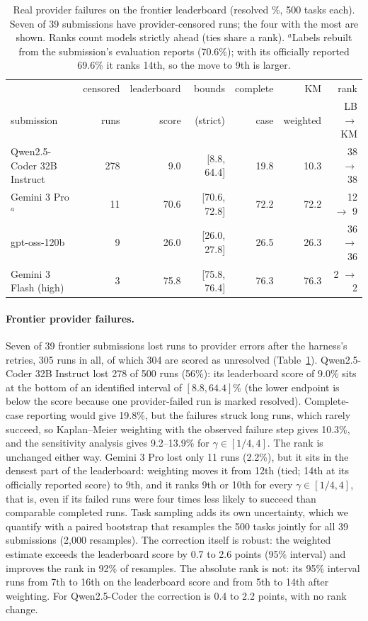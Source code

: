 \documentclass[11pt]{article}
\theoremstyle{definition}
\theoremstyle{remark}
\begin{document}
\begin{table}[t]
\centering
\small
\begin{tabular}{@{}lrrrrrr@{}}
\toprule
 & censored & leaderboard & bounds & complete & KM & rank \\
submission & runs & score & (strict) & case & weighted & LB $\to$ KM \\
\midrule
Qwen2.5-Coder 32B Instruct & 278 & 9.0 & [8.8, 64.4] & 19.8 & 10.3 & 38 $\to$ 38 \\
Gemini 3 Pro$^{a}$ & 11 & 70.6 & [70.6, 72.8] & 72.2 & 72.2 & 12 $\to$ 9 \\
gpt-oss-120b & 9 & 26.0 & [26.0, 27.8] & 26.5 & 26.3 & 36 $\to$ 36 \\
Gemini 3 Flash (high) & 3 & 75.8 & [75.8, 76.4] & 76.3 & 76.3 & 2 $\to$ 2 \\
\bottomrule
\end{tabular}
\caption{Real provider failures on the frontier leaderboard (resolved \%, 500
tasks each). Seven of 39 submissions have provider-censored runs; the four with
the most are shown. Ranks count models strictly ahead (ties share a rank).
$^{a}$Labels rebuilt from the submission's evaluation reports (70.6\%); with its
officially reported 69.6\% it ranks 14th, so the move to 9th is larger.}
\label{tab:frontier}
\end{table}

\paragraph{Frontier provider failures.} Seven of 39 frontier submissions lost
runs to provider errors after the harness's retries, 305 runs in all, of which
304 are scored as unresolved (Table~\ref{tab:frontier}). Qwen2.5-Coder 32B
Instruct lost 278 of 500 runs (56\%): its leaderboard score of 9.0\% sits at the
bottom of an identified interval of $[8.8,64.4]\%$ (the lower endpoint is below
the score because one provider-failed run is marked resolved). Complete-case reporting would give 19.8\%, but the failures
struck long runs, which rarely succeed, so Kaplan--Meier weighting with the
observed failure step gives 10.3\%, and the sensitivity analysis gives
9.2--13.9\% for $\gamma\in[1/4,4]$. The rank is unchanged either way. Gemini 3
Pro lost only 11 runs (2.2\%), but it sits in the densest part of the
leaderboard: weighting moves it from 12th (tied; 14th at its officially reported
score) to 9th, and it ranks 9th or 10th for every $\gamma\in[1/4,4]$, that is,
even if its failed runs were four times less likely to succeed than comparable
completed runs. Task sampling adds its own uncertainty, which we quantify with
a paired bootstrap that resamples the 500 tasks jointly for all 39 submissions
(2{,}000 resamples). The correction itself is robust: the weighted estimate
exceeds the leaderboard score by 0.7 to 2.6 points (95\% interval) and improves
the rank in 92\% of resamples. The absolute rank is not: its 95\% interval runs
from 7th to 16th on the leaderboard score and from 5th to 14th after weighting.
For Qwen2.5-Coder the correction is 0.4 to 2.2 points, with no rank change.
\end{document}
